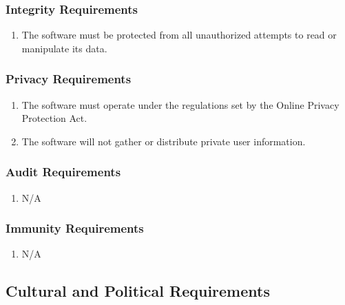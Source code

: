 \documentclass[]{article}
\begin{document}
\subsubsection{Integrity Requirements}
\label{ssub:integrity_requirements}
\begin{enumerate}[{SR}1. ]
	\item The software must be protected from all unauthorized attempts to read or manipulate its data.
\end{enumerate}

\subsubsection{Privacy Requirements}
\label{ssub:privacy_requirements}
\begin{enumerate}[{SR}1. ]
	\item The software must operate under the regulations set by the Online Privacy Protection Act.
	\item The software will not gather or distribute private user information.

\end{enumerate}

\subsubsection{Audit Requirements}
\label{ssub:audit_requirements}
\begin{enumerate}[{SR}1. ]
	\item N/A
\end{enumerate}

\subsubsection{Immunity Requirements}
\label{ssub:immunity_requirements}
\begin{enumerate}[{SR}1. ]
	\item N/A
\end{enumerate}


\subsection{Cultural and Political Requirements}
\label{sub:cultural_and_political_requirements}
\end{document}
